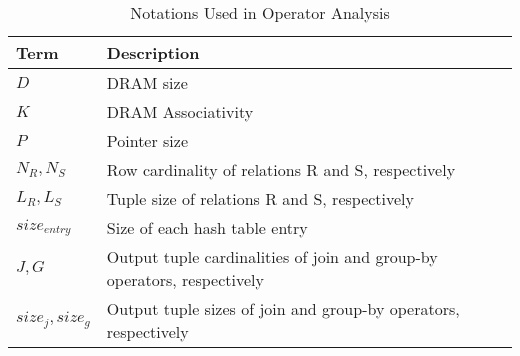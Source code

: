 \begin{table}[t]
\centering
\caption{Notations Used in Operator Analysis}
\label{tab:notations}
\begin{small}
\begin{tabular}{p{2cm}p{9cm}}
\toprule  
\textbf{Term} & \textbf{Description}\\ 
\midrule
\textbf{$D$} & DRAM size\\
\textbf{$K$} & DRAM Associativity\\
\textbf{$P$} & Pointer size\\
\textbf{$N_R, N_S$} & Row cardinality of relations R and S, respectively\\
\textbf{$L_R, L_S$} & Tuple size of relations R and S, respectively\\
\textbf{$size_{entry}$} & Size of each hash table entry\\
\textbf{$J,G$} & Output tuple cardinalities of join and group-by operators, respectively\\
\textbf{$size_{j},size_{g}$} & Output tuple sizes of join and group-by operators, respectively\\
\bottomrule
\end{tabular}
\end{small}
\end{table}
